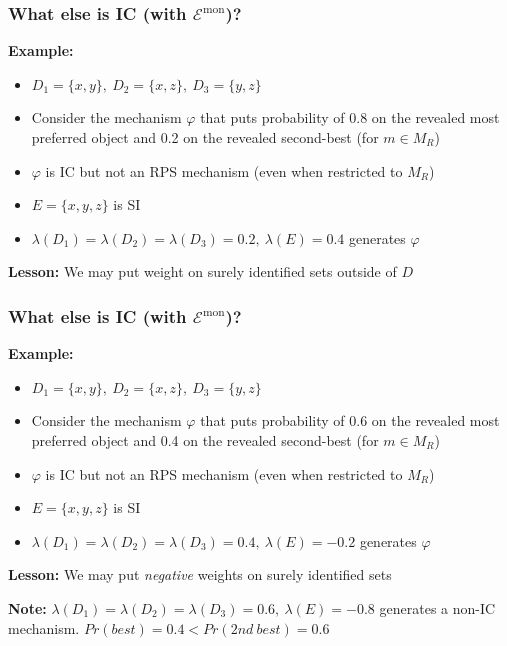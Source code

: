 \begin{frame}
  \frametitle{What else is IC (with $\mathcal{E}^\mathrm{mon}$)?}

\textbf{Example:}
\begin{itemize}
\item $D_1=\{x,y\},~ D_2=\{x,z\},~ D_3=\{y,z\}$
\item Consider the mechanism $\varphi$ that puts probability of 0.8 on the revealed most preferred object and 0.2 on the revealed second-best (for $m\in M_R$)
\item $\varphi$ is IC but not an RPS mechanism (even when restricted to $M_R$)
\item $E=\{x,y,z\}$ is SI
\item $\lambda(D_1)=\lambda(D_2)=\lambda(D_3)=0.2,~ \lambda(E)=0.4$ generates $\varphi$
\end{itemize}

\bigskip

\textbf{Lesson:} We may put weight on surely identified sets outside of $D$

\end{frame}

\begin{frame}
  \frametitle{What else is IC (with $\mathcal{E}^\mathrm{mon}$)?}

\textbf{Example:}
\begin{itemize}
\item $D_1=\{x,y\},~ D_2=\{x,z\},~ D_3=\{y,z\}$
\item Consider the mechanism $\varphi$ that puts probability of 0.6 on the revealed most preferred object and 0.4 on the revealed second-best (for $m\in M_R$)
\item $\varphi$ is IC but not an RPS mechanism (even when restricted to $M_R$)
\item $E=\{x,y,z\}$ is SI
\item $\lambda(D_1)=\lambda(D_2)=\lambda(D_3)=0.4,~ \lambda(E)=-0.2$ generates $\varphi$
\end{itemize}

\bigskip

\textbf{Lesson:} We may put \emph{negative} weights on surely identified sets

\bigskip

\textbf{Note:} $\lambda(D_1)=\lambda(D_2)=\lambda(D_3)=0.6,~ \lambda(E)=-0.8$ generates a non-IC mechanism. $Pr(best)=0.4 < Pr(2nd\ best) = 0.6$
\end{frame}

